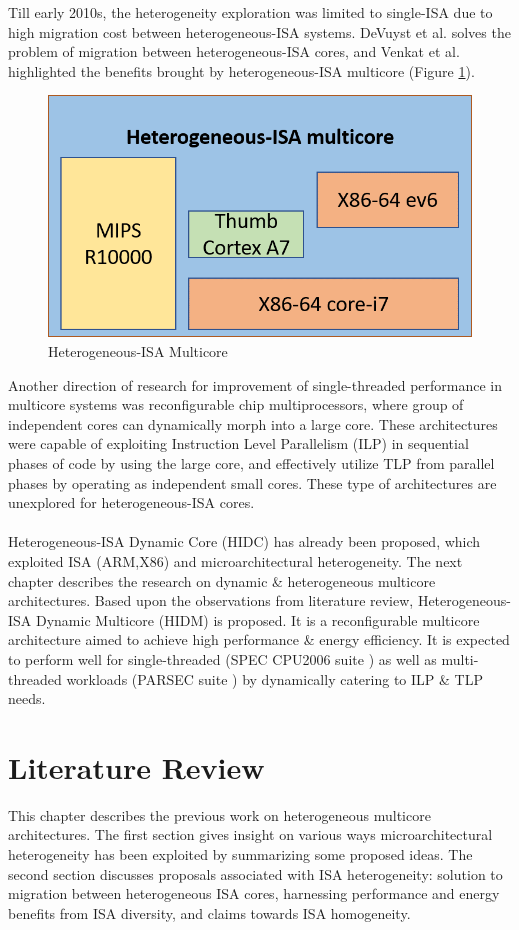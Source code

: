 \documentclass[a4paper,12pt, final]{report}
\begin{document}
\indent Till early 2010s, the heterogeneity exploration was limited to single-ISA due to high migration cost between heterogeneous-ISA systems. DeVuyst et al. \cite{DeVuystVT12} solves the problem of migration between heterogeneous-ISA cores, and Venkat et al. \cite{venkat} highlighted the benefits brought by heterogeneous-ISA multicore (Figure \ref{hetero-isa-mc}).
\begin{figure}[H]
    \centering
    \includegraphics[width=0.5\linewidth]{hetero-isa-mc.png}
    \caption{Heterogeneous-ISA Multicore}
    \label{hetero-isa-mc}
\end{figure}
\indent Another direction of research for improvement of single-threaded performance in multicore systems was reconfigurable chip multiprocessors, where group of independent cores can dynamically morph into a large core. These architectures were capable of exploiting Instruction Level Parallelism (ILP) in sequential phases of code by using the large core, and effectively utilize TLP from parallel phases by operating as independent small cores. These type of architectures are unexplored for heterogeneous-ISA cores. \\\\
\indent Heterogeneous-ISA Dynamic Core (HIDC) has already been proposed, which exploited ISA (ARM,X86) and microarchitectural heterogeneity. The next chapter describes the research on dynamic \& heterogeneous multicore architectures. Based upon the observations from literature review, Heterogeneous-ISA Dynamic Multicore (HIDM) is proposed. It is a reconfigurable multicore architecture aimed to achieve high performance \& energy efficiency. It is expected to perform well for single-threaded (SPEC CPU2006 suite \cite{speccpu}) as well as multi-threaded workloads (PARSEC suite \cite{parsec}) by dynamically catering to ILP \& TLP needs.\\
\indent 
\chapter{Literature Review}
This chapter describes the previous work on heterogeneous multicore architectures. The first section gives insight on various ways microarchitectural heterogeneity has been exploited by summarizing some proposed ideas. The second section discusses proposals associated with ISA heterogeneity: solution to migration between heterogeneous ISA cores, harnessing performance and energy benefits from ISA diversity, and claims towards ISA homogeneity.  
\end{document}
